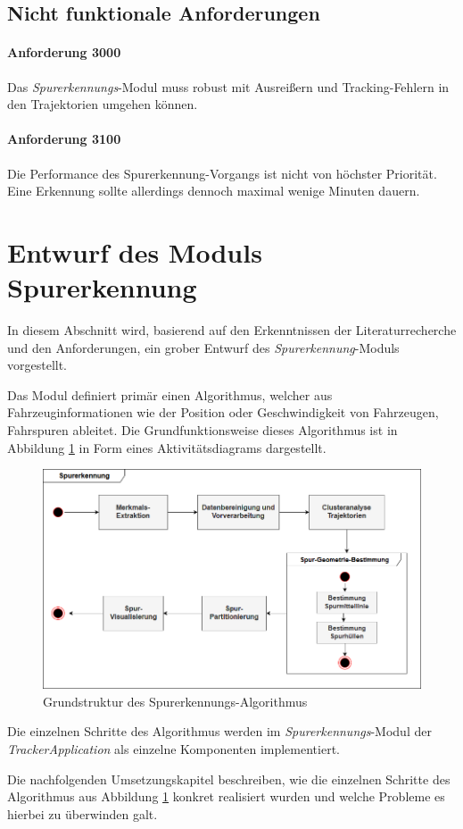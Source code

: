 \subsection{Nicht funktionale Anforderungen}

\paragraph{Anforderung 3000}
Das \textit{Spurerkennungs}-Modul muss robust mit Ausreißern und Tracking-Fehlern in den Trajektorien umgehen können.

\paragraph{Anforderung 3100}
Die Performance des Spurerkennung-Vorgangs ist nicht von höchster Priorität. Eine Erkennung sollte allerdings
dennoch maximal wenige Minuten dauern.


\section{Entwurf des Moduls Spurerkennung}
\label{sec:design}

In diesem Abschnitt wird, basierend auf den Erkenntnissen der Literaturrecherche und den Anforderungen,
ein grober Entwurf des \textit{Spurerkennung}-Moduls vorgestellt.

Das Modul definiert primär einen Algorithmus, welcher aus Fahrzeuginformationen wie der Position
oder Geschwindigkeit von Fahrzeugen, Fahrspuren ableitet. Die Grundfunktionsweise dieses Algorithmus
ist in Abbildung \ref{fig:concept_laneDetection_activity} in Form eines Aktivitätsdiagrams dargestellt.

\begin{figure}[H]
    \centering
    \includegraphics[width=0.8\linewidth]{../resources/img/konzeption/activity_laneDetection}
    \caption{Grundstruktur des Spurerkennungs-Algorithmus}
    \label{fig:concept_laneDetection_activity}
\end{figure}

Die einzelnen Schritte des Algorithmus werden im \textit{Spurerkennungs}-Modul der \textit{TrackerApplication}
als einzelne Komponenten implementiert.

Die nachfolgenden Umsetzungskapitel beschreiben, wie die einzelnen Schritte des Algorithmus aus
Abbildung \ref{fig:concept_laneDetection_activity} konkret realisiert wurden und welche Probleme es hierbei
zu überwinden galt.